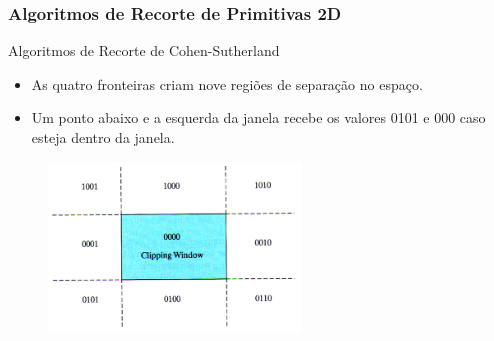 \documentclass{beamer}
\begin{document}
\begin{frame}
\frametitle{Algoritmos de Recorte de Primitivas 2D}

	\begin{block}{Algoritmos de Recorte de Cohen-Sutherland}
		\begin{itemize}
			\item As quatro fronteiras criam nove regiões de separação no espaço.
			\item Um ponto abaixo e a esquerda da janela recebe os valores 0101 e 000 caso esteja dentro da janela.
		\end{itemize}
	\end{block}
	\begin{figure}[!h]
			\begin{center}
				\includegraphics[width=0.6\textwidth]{Figures/FroRec}
			\end{center}
	\end{figure}	
			
\end{frame}
\end{document}
